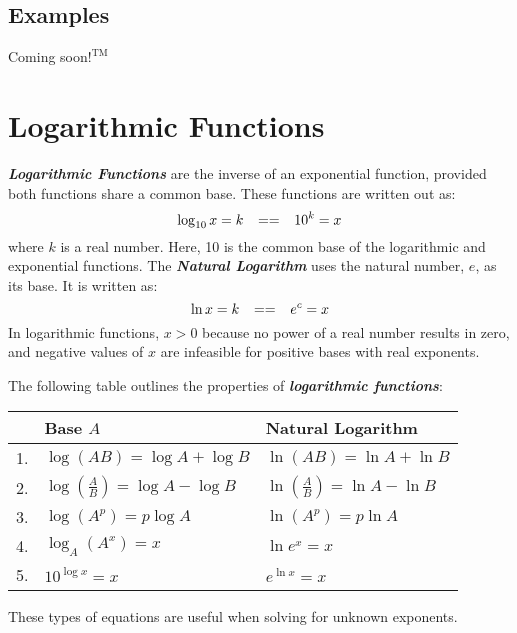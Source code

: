 \begin{center}
\section*{\small Examples}
Coming soon$!^{\text{TM}}$
\end{center}

\section{Logarithmic Functions}
\textbf{\textit{Logarithmic Functions}} are the inverse of an exponential function, provided both functions share a common base. These functions are written out as:
\begin{equation}
\log_{10}x = k \hphantom{-} == \hphantom{-} 10^k = x
\end{equation}
where $k$ is a real number. Here, 10 is the common base of the logarithmic and exponential functions. The \textbf{\textit{Natural Logarithm}} uses the natural number, $e$, as its base. It is written as:
\begin{equation}
\ln x = k \hphantom{-} == \hphantom{-} e^c = x
\end{equation}
In logarithmic functions, $x > 0$ because no power of a real number results in zero, and negative values of $x$ are infeasible for positive bases with real exponents.

\vspace{0.1in}
The following table outlines the properties of \textbf{\textit{logarithmic functions}}:
\begin{table*}[h]
\begin{center}
\begin{tabular}{lll}
& \textbf{Base} $A$ & \textbf{Natural Logarithm}\\
\hline
1. & $\log\left(AB\right) = \log A + \log B$ & $\ln\left(AB\right) = \ln A + \ln B$\\
2. &  $\log\left(\frac{A}{B}\right) = \log A - \log B$ & $\ln\left(\frac{A}{B}\right) = \ln A - \ln B$\\
3. & $\log\left(A^p\right) = p \log A$ & $\ln \left(A^p\right) = p \ln A$\\
4. & $\log_A\left(A^x\right) = x$ & $\ln e^x = x$\\
5. & $10^{\log x} = x$ & $e^{\ln x} = x$
\end{tabular}
\end{center}
\end{table*}

These types of equations are useful when solving for unknown exponents.

